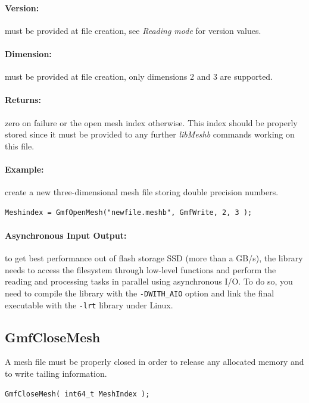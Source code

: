\documentclass[a4paper,12pt]{article}
\begin{document}
\paragraph{Version:}
must be provided at file creation, see \emph{Reading mode} for version values.

\paragraph{Dimension:}
must be provided at file creation, only dimensions 2 and 3 are supported.

\paragraph{Returns:}
zero on failure or the open mesh index otherwise. This index should be properly stored since it must be provided to any further \emph{libMeshb} commands working on this file.

\paragraph{Example:} create a new three-dimensional mesh file storing double precision numbers.

\begin{tt}
\begin{verbatim}
Meshindex = GmfOpenMesh("newfile.meshb", GmfWrite, 2, 3 );
\end{verbatim}
\end{tt}
\normalfont

\paragraph{Asynchronous Input Output:}
to get best performance out of flash storage SSD (more than a GB/s), the library needs to access the filesystem through low-level functions and perform the reading and processing tasks in parallel using asynchronous I/O. To do so, you need to compile the library with the {\tt -DWITH\_AIO} option and link the final executable with the {\tt -lrt} library under Linux.


\subsection{GmfCloseMesh}
A mesh file must be properly closed in order to release any allocated memory and to write tailing information.

\begin{tt}
\begin{verbatim}
GmfCloseMesh( int64_t MeshIndex );
\end{verbatim}
\end{tt}
\normalfont
\end{document}
